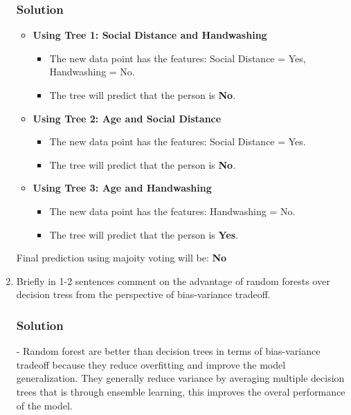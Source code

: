 \documentclass{article}
\begin{document}
\begin{enumerate}[label=\alph*)]
   \subsubsection*{Solution}
   \begin{itemize}
      \item \textbf{Using Tree 1: Social Distance and Handwashing}\\
      \begin{itemize}
         \item The new data point has the features: Social Distance = Yes, Handwashing = No.
         \item The tree will predict that the person is \textbf{No}.
      \end{itemize}
      \item \textbf{Using Tree 2: Age and Social Distance}\\
      \begin{itemize}
         \item The new data point has the features: Social Distance = Yes.
         \item The tree will predict that the person is \textbf{No}.
      \end{itemize}
      \item \textbf{Using Tree 3: Age and Handwashing}\\
      \begin{itemize}
         \item The new data point has the features: Handwashing = No.
         \item The tree will predict that the person is \textbf{Yes}.
      \end{itemize}
   \end{itemize}
   Final prediction using majoity voting will be: \textbf{No}

   \item Briefly in 1-2 sentences comment on the advantage of random forests over decision tress from the perspective of bias-variance tradeoff.
   \subsubsection*{Solution}
   - Random forest are better than decision trees in terms of bias-variance tradeoff because they reduce
   overfitting and improve the model generalization. They generally reduce variance by averaging multiple decision trees that is through
   ensemble learning, this improves the overal performance of the model.
\end{enumerate}
\end{document}
